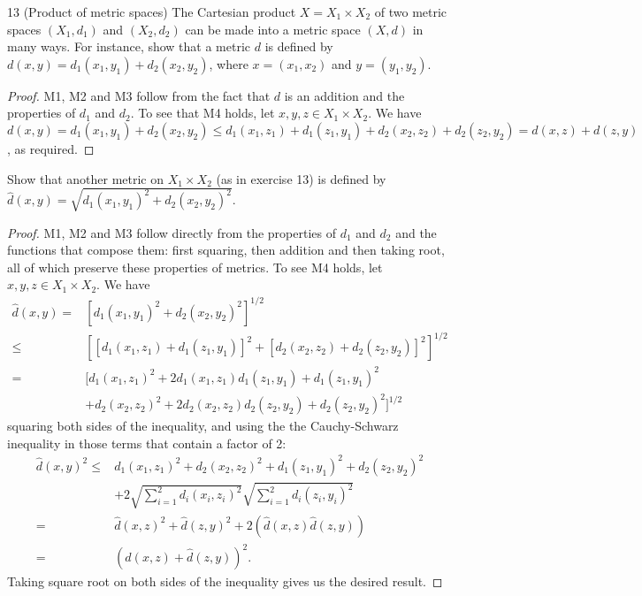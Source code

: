 \begin{exercise}{13 (Product of metric spaces)}
The Cartesian product $X=X_1\times X_2$ of two metric spaces $(X_1, d_1)$ and $(X_2, d_2)$ can be made into a metric space $(X, d)$ in many ways. For instance, show that a metric $d$ is defined by $d(x,y)=d_1(x_1,y_1)+d_2(x_2,y_2)$, where $x=(x_1,x_2)$ and $y=(y_1,y_2)$.
\end{exercise}
\begin{proof}
M1, M2 and M3 follow from the fact that $d$ is an addition and the properties of $d_1$ and $d_2$. To see that M4 holds, let $x,y,z\in X_1\times X_2$. We have $d(x,y) =d_1(x_1,y_1)+d_2(x_2,y_2) \leq d_1(x_1,z_1)+d_1(z_1,y_1) + d_2(x_2,z_2)+d_2(z_2,y_2) = d(x,z)+d(z,y)$, as required.
\end{proof}

\begin{exercise}{14}
Show that another metric on $X_1\times X_2$ (as in exercise 13) is defined by $\hat{d}(x,y)=\sqrt{d_1(x_1,y_1)^2+d_2(x_2,y_2)^2}$.
\end{exercise}
\begin{proof}
M1, M2 and M3 follow directly from the properties of $d_1$ and $d_2$ and the functions that compose them: first squaring, then addition and then taking root, all of which preserve these properties of metrics. To see M4 holds, let $x,y,z\in X_1\times X_2$. We have 
\begin{align*}
    \hat{d}(x,y) =& [d_1(x_1,y_1)^2+d_2(x_2,y_2)^2]^{1/2}\\
    \leq& [[d_1(x_1,z_1)+d_1(z_1,y_1)]^2+[d_2(x_2,z_2)+d_2(z_2,y_2)]^2]^{1/2}\\
    =& [d_1(x_1,z_1)^2+2d_1(x_1,z_1)d_1(z_1,y_1)+d_1(z_1,y_1)^2\\
    &+ d_2(x_2,z_2)^2+2d_2(x_2,z_2)d_2(z_2,y_2)+d_2(z_2,y_2)^2]^{1/2}
\end{align*}
squaring both sides of the inequality, and using the the Cauchy-Schwarz inequality in those terms that contain a factor of 2:
\begin{align*}
    \hat{d}(x,y)^2 
    \leq&  d_1(x_1,z_1)^2+d_2(x_2,z_2)^2 +d_1(z_1,y_1)^2+d_2(z_2,y_2)^2\\
    &+2\sqrt{\sum_{i=1}^2d_i(x_i,z_i)^2}\sqrt{\sum_{i=1}^2d_i(z_i,y_i)^2}\\
    =& \hat{d}(x,z)^2 + \hat{d}(z,y)^2+ 2(\hat{d}(x,z)\hat{d}(z,y))\\
    =& (\hat{d}(x,z)+\hat{d}(z,y))^2.
\end{align*}
Taking square root on both sides of the inequality gives us the desired result.
\end{proof}

